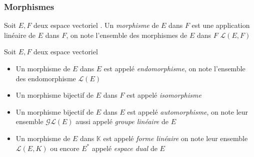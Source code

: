 \documentclass[11pt,colorlinks]{book}
\theoremstyle{mytheoremstyle}
\theoremstyle{mytheoremstyle}
\theoremstyle{mytheoremstyle}
\theoremstyle{mytheoremstyle}
\theoremstyle{mytheoremstyle}
\theoremstyle{mytheoremstyle}
\theoremstyle{mytheoremstyle}
\theoremstyle{mytheoremstyle}
\theoremstyle{myproblemstyle}
\def\mbb#1{\mathbb{#1}}
\def\mfc#1{\mathcal{#1}}
\def\bK{\mbb{K}}
\def\ev{espace vectoriel }
\def\mor{\mfc{L}(E,F)}
\def\endo{\mfc{L}(E)}
\begin{document}
\subsubsection{Morphismes}
\begin{definition}
  Soit $E,F$ deux \ev. Un \textit{morphisme} de $E$ dans $F$ est une application linéaire de $E$ dans $F$, on note 
  l'ensemble des morphismes de $E$ dans $F$ $\mor$
\end{definition}
\begin{definition}
  Soit $E,F$ deux \ev
  \begin{itemize}
    \item Un morphisme de $E$ dans $E$ est appelé \textit{endomorphisme}, on note l'ensemble des endomorphisme $\endo$
    \item Un morphisme bijectif de $E$ dans $F$ est appelé \textit{isomorphisme}
    \item Un morphisme bijectif de $E$ dans $E$ est appelé \textit{automorphisme}, on note leur ensemble $\mfc{GL}(E)$ aussi 
    appelé \textit{groupe linéaire} de $E$
    \item Un morphisme de $E$ dans $\bK$ est appelé \textit{forme linéaire} on note leur ensemble $\mfc{L}(E,K)$ ou encore $E^*$ appelé 
    \textit{espace dual} de $E$
  \end{itemize}
\end{definition}
\end{document}
